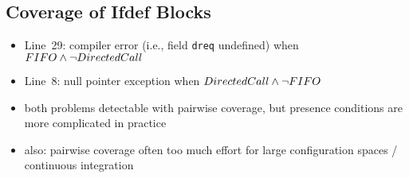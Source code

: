 \subsection{Coverage of Ifdef Blocks}
\begin{frame}[b]
	\pause
	\begin{itemize}
		\item<+-> Line~29: compiler error (i.e., field \texttt{dreq} undefined) %
		when $FIFO \wedge \neg DirectedCall$
		\item<+-> Line~8: null pointer exception %
		when $DirectedCall \wedge \neg FIFO$
		\item<+-> both problems detectable with pairwise coverage, but presence conditions are more complicated in practice
		\item<+-> also: pairwise coverage often too much effort for large configuration spaces / continuous integration
	\end{itemize}
\end{frame}


